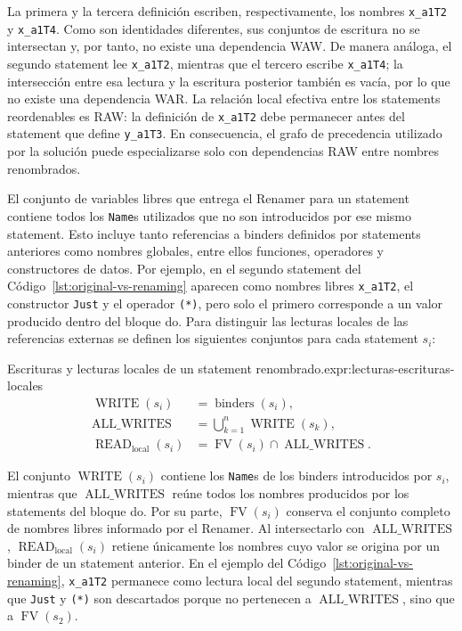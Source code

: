 La primera y la tercera definición escriben, respectivamente, los nombres \texttt{x\_a1T2} y \texttt{x\_a1T4}. Como son identidades diferentes, sus conjuntos de escritura no se intersectan y, por tanto, no existe una dependencia WAW. De manera análoga, el segundo statement lee \texttt{x\_a1T2}, mientras que el tercero escribe \texttt{x\_a1T4}; la intersección entre esa lectura y la escritura posterior también es vacía, por lo que no existe una dependencia WAR. La relación local efectiva entre los statements reordenables es RAW: la definición de \texttt{x\_a1T2} debe permanecer antes del statement que define \texttt{y\_a1T3}. En consecuencia, el grafo de precedencia utilizado por la solución puede especializarse solo con dependencias RAW entre nombres renombrados.

El conjunto de variables libres que entrega el Renamer para un statement contiene todos los \texttt{Name}s utilizados que no son introducidos por ese mismo statement. Esto incluye tanto referencias a binders definidos por statements anteriores como nombres globales, entre ellos funciones, operadores y constructores de datos. Por ejemplo, en el segundo statement del Código~\ref{lst:original-vs-renaming} aparecen como nombres libres \texttt{x\_a1T2}, el constructor \texttt{Just} y el operador \verb|(*)|, pero solo el primero corresponde a un valor producido dentro del bloque \textsf{do}. Para distinguir las lecturas locales de las referencias externas se definen los siguientes conjuntos para cada statement $s_i$:

\begin{ReportExpression}{Escrituras y lecturas locales de un statement renombrado.}{expr:lecturas-escrituras-locales}
\[
\begin{aligned}
\operatorname{WRITE}(s_i) &= \operatorname{binders}(s_i),\\
\operatorname{ALL\_WRITES} &= \bigcup_{k=1}^{n}\operatorname{WRITE}(s_k),\\
\operatorname{READ}_{\mathrm{local}}(s_i)
  &= \operatorname{FV}(s_i)\cap\operatorname{ALL\_WRITES}.
\end{aligned}
\]
\end{ReportExpression}

El conjunto $\operatorname{WRITE}(s_i)$ contiene los \texttt{Name}s de los binders introducidos por $s_i$, mientras que $\operatorname{ALL\_WRITES}$ reúne todos los nombres producidos por los statements del bloque \textsf{do}. Por su parte, $\operatorname{FV}(s_i)$ conserva el conjunto completo de nombres libres informado por el Renamer. Al intersectarlo con $\operatorname{ALL\_WRITES}$, $\operatorname{READ}_{\mathrm{local}}(s_i)$ retiene únicamente los nombres cuyo valor se origina por un binder de un statement anterior. En el ejemplo del Código~\ref{lst:original-vs-renaming}, \texttt{x\_a1T2} permanece como lectura local del segundo statement, mientras que \texttt{Just} y \verb|(*)| son descartados porque no pertenecen a $\operatorname{ALL\_WRITES}$, sino que a $\operatorname{FV}(s_2)$.

